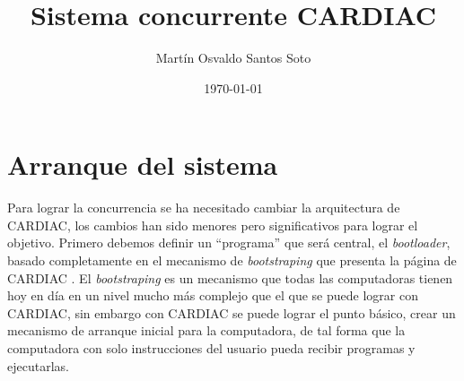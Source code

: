 \documentclass[12pt]{article}
\title{Sistema concurrente CARDIAC}
\author{Martín Osvaldo Santos Soto}
\date{\today}
\begin{document}
	\maketitle

	
	\section{ Arranque del sistema} %
 	 
 	 Para lograr la concurrencia se ha necesitado cambiar la arquitectura de CARDIAC, los cambios han sido menores pero significativos
	 para lograr el objetivo. Primero debemos definir un ``programa'' que será central, el \textit{bootloader}, basado
	 completamente en el mecanismo de \textit{bootstraping} que presenta la página de CARDIAC \cite{noauthor_cardiac_nodate}. El \textit{bootstraping} es un 
	 mecanismo que todas las computadoras tienen hoy en día en un nivel mucho más complejo que el que se puede lograr con CARDIAC, sin
	 embargo con CARDIAC se puede lograr el punto básico, crear un mecanismo de arranque inicial para la computadora, de tal forma
	 que la computadora con solo instrucciones del usuario pueda recibir programas y ejecutarlas. 
	 
\end{document}
